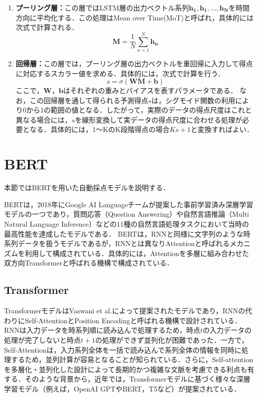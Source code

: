 \documentclass[a4paper,12pt,oneside,openany]{jsbook}
\begin{document}
\begin{enumerate}
\item {\bf プーリング層：}この層ではLSTM層の出力ベクトル系列${\mathbf{h_{1}},\mathbf{h_{1}},...,\mathbf{h_{N}}}$を時間方向に平均化する．この処理はMean over Time(MoT)と呼ばれ，具体的には次式で計算される．
\begin{equation}
\mathbf{M}=\frac{1}{N}\sum_{n=1}^{N}\mathbf{h_{n}}
\end{equation}

\item {\bf 回帰層：}この層では，プーリング層の出力ベクトルを重回帰に入力して得点に対応するスカラー値を求める．具体的には，次式で計算を行う．
\begin{equation}
s=\sigma(\mathbf{W}\mathbf{M}+\mathbf{b})
\end{equation}
ここで，$\mathbf{W}$，$\mathbf{b}$はそれぞれの重みとバイアスを表すパラメータである．
なお，この回帰層を通して得られる予測得点$s$は，シグモイド関数の利用により0から1の範囲の値となる．したがって，実際のデータの得点尺度はこれと異なる場合には，$s$を線形変換して実データの得点尺度に合わせる処理が必要となる．具体的には，1〜KのK段階得点の場合$Ks+1$と変換すればよい．
\end{enumerate}

\section{BERT}

本節ではBERTを用いた自動採点モデル\cite{BERT1,BERT4,Hybridmodel1,BERT6}を説明する．

BERTは，2018年にGoogle AI Languageチームが提案した事前学習済み深層学習モデルの一つであり\cite{BERT2}，質問応答（Question Answering）や自然言語推論（Multi Natural Language Inference）などの11種の自然言語処理タスクにおいて当時の最高性能を達成したモデルである\cite{BERT5}．
BERTは，RNNと同様に文字列のような時系列データを扱うモデルであるが，RNNとは異なりAttentionと呼ばれるメカニズムを利用して構成されている．具体的には，Attentionを多層に組み合わせた双方向Transformer\cite{BERT3}と呼ばれる機構で構成されている．

\subsection{Transformer}

TransformerモデルはVaswani et al.\cite{BERT3}によって提案されたモデルであり，RNNの代わりにSelf-AttentionとPosition Encodingと呼ばれる機構で設計されている．RNNは入力データを時系列順に読み込んで処理するため，時点$t$の入力データの処理が完了しないと時点$t+1$の処理ができず並列化が困難であった．一方で，Self-Attentionは，入力系列全体を一括で読み込んで系列全体の情報を同時に処理するため，並列計算が容易となることが知られている．さらに，Self-attentionを多層化・並列化した設計によって長期的かつ複雑な文脈を考慮できる利点も有する．そのような背景から，近年では，Transformerモデルに基づく様々な深層学習モデル（例えば，OpenAI GPT\cite{OpenAIGPT}やBERT，T5など）が提案されている．
\end{document}
